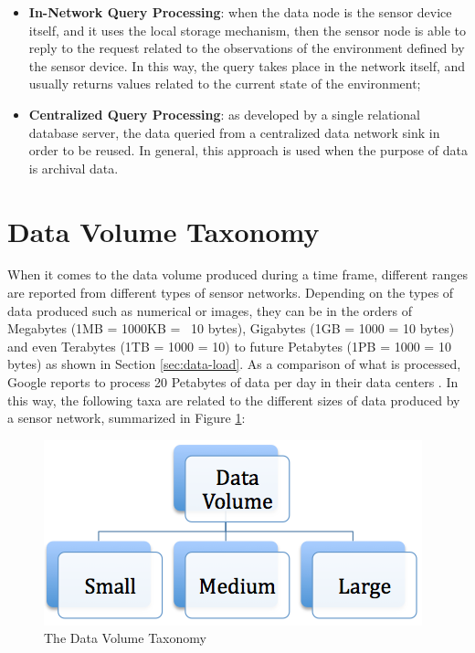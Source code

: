 \begin{itemize}
  \item \textbf{In-Network Query Processing}: when the data node is the
  sensor device itself, and it uses the local storage mechanism, then the
  sensor node is able to reply to the request related to the observations of the 
  environment defined by the sensor device. In this way, the query takes 
  place in the network itself, and usually returns values related to the current
  state of the environment;
  \item \textbf{Centralized Query Processing}: as developed by a single 
  relational database server, the data queried from a centralized data
  network sink in order to be reused. In general, this approach is used when
  the purpose of data is archival data.
\end{itemize}

\section{Data Volume Taxonomy}

When it comes to the data volume produced during a time frame, different ranges
are reported from different types of sensor networks. Depending on the types
of data produced such as numerical or images, they can be in the orders of
Megabytes (1MB = 1000KB = ~10 bytes), Gigabytes (1GB =
1000 = 10 bytes) and even Terabytes (1TB =
1000 = 10) to future Petabytes (1PB =
1000 = 10 bytes) as shown in Section
\ref{sec:data-load}. As a comparison of what is processed, Google reports to
process 20 Petabytes of data per day in their data centers
\cite{map-reduce-load}. In this way, the following taxa are related to the
different sizes of data produced by a sensor network, summarized in Figure
\ref{fig:taxonomy-data-volume}:

\begin{figure}[h]
  \centering
  \includegraphics[scale=0.5]{../diagrams/taxonomy-data-volume}
  \caption{The Data Volume Taxonomy}
  \label{fig:taxonomy-data-volume}
\end{figure}

